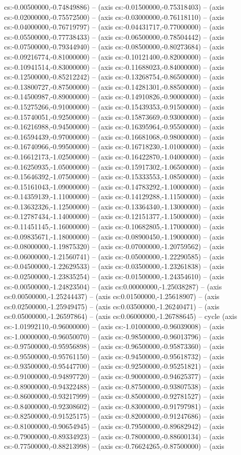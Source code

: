 cs:-0.00500000,-0.74849886) -- (axis cs:-0.01500000,-0.75318403) -- (axis cs:-0.02000000,-0.75572500) -- (axis cs:-0.03000000,-0.76118110) -- (axis cs:-0.04000000,-0.76719797) -- (axis cs:-0.04431717,-0.77000000) -- (axis cs:-0.05500000,-0.77738433) -- (axis cs:-0.06500000,-0.78504442) -- (axis cs:-0.07500000,-0.79344940) -- (axis cs:-0.08500000,-0.80273684) -- (axis cs:-0.09216774,-0.81000000) -- (axis cs:-0.10121400,-0.82000000) -- (axis cs:-0.10941514,-0.83000000) -- (axis cs:-0.11688023,-0.84000000) -- (axis cs:-0.12500000,-0.85212242) -- (axis cs:-0.13268754,-0.86500000) -- (axis cs:-0.13800727,-0.87500000) -- (axis cs:-0.14281301,-0.88500000) -- (axis cs:-0.14500987,-0.89000000) -- (axis cs:-0.14910826,-0.90000000) -- (axis cs:-0.15275266,-0.91000000) -- (axis cs:-0.15439353,-0.91500000) -- (axis cs:-0.15740051,-0.92500000) -- (axis cs:-0.15873669,-0.93000000) -- (axis cs:-0.16216988,-0.94500000) -- (axis cs:-0.16395964,-0.95500000) -- (axis cs:-0.16594439,-0.97000000) -- (axis cs:-0.16681068,-0.98000000) -- (axis cs:-0.16740966,-0.99500000) -- (axis cs:-0.16718230,-1.01000000) -- (axis cs:-0.16612173,-1.02500000) -- (axis cs:-0.16422870,-1.04000000) -- (axis cs:-0.16250935,-1.05000000) -- (axis cs:-0.15917302,-1.06500000) -- (axis cs:-0.15646392,-1.07500000) -- (axis cs:-0.15333553,-1.08500000) -- (axis cs:-0.15161043,-1.09000000) -- (axis cs:-0.14783292,-1.10000000) -- (axis cs:-0.14359139,-1.11000000) -- (axis cs:-0.14129288,-1.11500000) -- (axis cs:-0.13632326,-1.12500000) -- (axis cs:-0.13364340,-1.13000000) -- (axis cs:-0.12787434,-1.14000000) -- (axis cs:-0.12151377,-1.15000000) -- (axis cs:-0.11451145,-1.16000000) -- (axis cs:-0.10682805,-1.17000000) -- (axis cs:-0.09835671,-1.18000000) -- (axis cs:-0.08900450,-1.19000000) -- (axis cs:-0.08000000,-1.19875320) -- (axis cs:-0.07000000,-1.20759562) -- (axis cs:-0.06000000,-1.21560741) -- (axis cs:-0.05000000,-1.22290585) -- (axis cs:-0.04500000,-1.22629533) -- (axis cs:-0.03500000,-1.23261838) -- (axis cs:-0.02500000,-1.23835254) -- (axis cs:-0.01500000,-1.24354610) -- (axis cs:-0.00500000,-1.24823504) -- (axis cs:0.00000000,-1.25038287) -- (axis cs:0.00500000,-1.25244437) -- (axis cs:0.01500000,-1.25618907) -- (axis cs:0.02500000,-1.25949475) -- (axis cs:0.03500000,-1.26240471) -- (axis cs:0.05000000,-1.26597864) -- (axis cs:0.06000000,-1.26788645) -- cycle (axis cs:-1.01992110,-0.96000000) -- (axis cs:-1.01000000,-0.96039008) -- (axis cs:-1.00000000,-0.96050070) -- (axis cs:-0.98500000,-0.96013796) -- (axis cs:-0.97500000,-0.95956898) -- (axis cs:-0.96500000,-0.95873360) -- (axis cs:-0.95500000,-0.95761150) -- (axis cs:-0.94500000,-0.95618732) -- (axis cs:-0.93500000,-0.95447700) -- (axis cs:-0.92500000,-0.95251821) -- (axis cs:-0.91000000,-0.94897720) -- (axis cs:-0.90000000,-0.94625377) -- (axis cs:-0.89000000,-0.94322488) -- (axis cs:-0.87500000,-0.93807538) -- (axis cs:-0.86000000,-0.93217999) -- (axis cs:-0.85000000,-0.92781527) -- (axis cs:-0.84000000,-0.92308602) -- (axis cs:-0.83000000,-0.91797981) -- (axis cs:-0.82500000,-0.91525175) -- (axis cs:-0.82000000,-0.91247686) -- (axis cs:-0.81000000,-0.90654945) -- (axis cs:-0.79500000,-0.89682942) -- (axis cs:-0.79000000,-0.89334923) -- (axis cs:-0.78000000,-0.88600134) -- (axis cs:-0.77500000,-0.88213998) -- (axis cs:-0.76624265,-0.87500000) -- (axis 